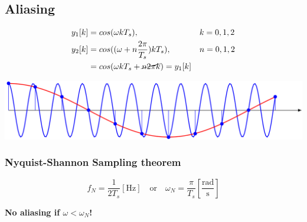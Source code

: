 \subsection{Aliasing}
    \begin{align*}
        y_1[k] &= cos(\omega k T_s), &&k = 0, 1, 2\\
        y_2[k] &= cos((\omega + n\frac{2\pi}{T_s})k T_s), &&n = 0, 1, 2\\
        &= cos(\omega k T_s + \text{\cancel{$n2\pi k$}}) = y_1[k]
    \end{align*}
    \centerline{\includegraphics[width=0.8\linewidth]{src/1_discrete_time/images/aliasing.jpg}}
    \vspace{0pt}

    \subsubsection{Nyquist-Shannon Sampling theorem}
        $$
        f_N = \frac{1}{2T_s}\left[\text{Hz}\right] \quad \text{or} \quad \omega_N = \frac{\pi}{T_s}\left[\frac{\text{rad}}{\text{s}}\right]
        $$

        \centerline{\textbf{No aliasing if $\omega < \omega_N$!}}